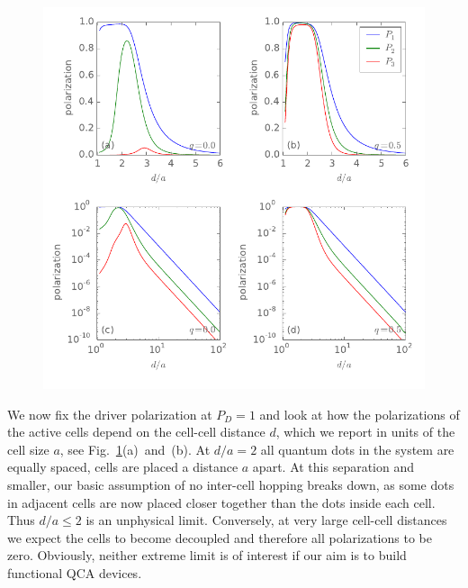 %
\begin{figure}
  \center
  \includegraphics{three_cells_P_over_d}
  \caption{
  }
  \label{fig:three_cells_P_over_d}
\end{figure}
%

We now fix the driver polarization at $P_D = 1$ and look at how the
polarizations of the active cells depend on the cell-cell distance $d$, which we
report in units of the cell size $a$, see
Fig.~\ref{fig:three_cells_P_over_d}(a)~and~(b). At $d/a = 2$ all quantum dots in
the system are equally spaced, cells are placed a distance $a$ apart. At this
separation and smaller, our basic assumption of no inter-cell hopping breaks
down, as some dots in adjacent cells are now placed closer together than the
dots inside each cell. Thus $d/a \le 2$ is an unphysical limit. Conversely, at
very large cell-cell distances we expect the cells to become decoupled and
therefore all polarizations to be zero. Obviously, neither extreme limit is of
interest if our aim is to build functional QCA devices.

